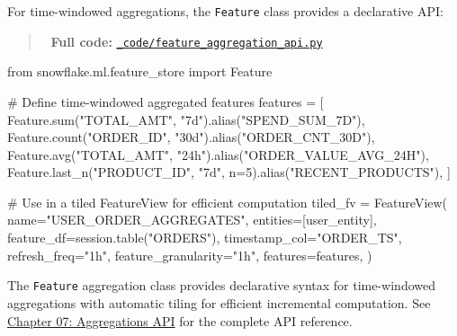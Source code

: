 \documentclass[
  letterpaper,
  DIV=11,
  numbers=noendperiod]{scrreprt}
\newenvironment{Shaded}{\begin{snugshade}}{\end{snugshade}}
\newcommand{\BuiltInTok}[1]{\textcolor[rgb]{0.00,0.23,0.31}{#1}}
\newcommand{\CommentTok}[1]{\textcolor[rgb]{0.37,0.37,0.37}{#1}}
\newcommand{\DecValTok}[1]{\textcolor[rgb]{0.68,0.00,0.00}{#1}}
\newcommand{\ImportTok}[1]{\textcolor[rgb]{0.00,0.46,0.62}{#1}}
\newcommand{\NormalTok}[1]{\textcolor[rgb]{0.00,0.23,0.31}{#1}}
\newcommand{\OperatorTok}[1]{\textcolor[rgb]{0.37,0.37,0.37}{#1}}
\newcommand{\StringTok}[1]{\textcolor[rgb]{0.13,0.47,0.30}{#1}}
\begin{document}
For time-windowed aggregations, the \texttt{Feature} class provides a
declarative API:

\begin{quote}
📁 \textbf{Full code:}
\href{_code/feature_aggregation_api.py}{\texttt{\_code/feature\_aggregation\_api.py}}
\end{quote}

\begin{Shaded}
\begin{Highlighting}[]
\ImportTok{from}\NormalTok{ snowflake.ml.feature\_store }\ImportTok{import}\NormalTok{ Feature}

\CommentTok{\# Define time{-}windowed aggregated features}
\NormalTok{features }\OperatorTok{=}\NormalTok{ [}
\NormalTok{    Feature.}\BuiltInTok{sum}\NormalTok{(}\StringTok{"TOTAL\_AMT"}\NormalTok{, }\StringTok{"7d"}\NormalTok{).alias(}\StringTok{"SPEND\_SUM\_7D"}\NormalTok{),}
\NormalTok{    Feature.count(}\StringTok{"ORDER\_ID"}\NormalTok{, }\StringTok{"30d"}\NormalTok{).alias(}\StringTok{"ORDER\_CNT\_30D"}\NormalTok{),}
\NormalTok{    Feature.avg(}\StringTok{"TOTAL\_AMT"}\NormalTok{, }\StringTok{"24h"}\NormalTok{).alias(}\StringTok{"ORDER\_VALUE\_AVG\_24H"}\NormalTok{),}
\NormalTok{    Feature.last\_n(}\StringTok{"PRODUCT\_ID"}\NormalTok{, }\StringTok{"7d"}\NormalTok{, n}\OperatorTok{=}\DecValTok{5}\NormalTok{).alias(}\StringTok{"RECENT\_PRODUCTS"}\NormalTok{),}
\NormalTok{]}

\CommentTok{\# Use in a tiled FeatureView for efficient computation}
\NormalTok{tiled\_fv }\OperatorTok{=}\NormalTok{ FeatureView(}
\NormalTok{    name}\OperatorTok{=}\StringTok{"USER\_ORDER\_AGGREGATES"}\NormalTok{,}
\NormalTok{    entities}\OperatorTok{=}\NormalTok{[user\_entity],}
\NormalTok{    feature\_df}\OperatorTok{=}\NormalTok{session.table(}\StringTok{"ORDERS"}\NormalTok{),}
\NormalTok{    timestamp\_col}\OperatorTok{=}\StringTok{"ORDER\_TS"}\NormalTok{,}
\NormalTok{    refresh\_freq}\OperatorTok{=}\StringTok{"1h"}\NormalTok{,}
\NormalTok{    feature\_granularity}\OperatorTok{=}\StringTok{"1h"}\NormalTok{,}
\NormalTok{    features}\OperatorTok{=}\NormalTok{features,}
\NormalTok{)}
\end{Highlighting}
\end{Shaded}

\begin{tcolorbox}[enhanced jigsaw, title=\textcolor{quarto-callout-note-color}{\faInfo}\hspace{0.5em}{🆕 New in snowflake-ml 1.21+}, colbacktitle=quarto-callout-note-color!10!white, rightrule=.15mm, arc=.35mm, colframe=quarto-callout-note-color-frame, left=2mm, bottomtitle=1mm, toptitle=1mm, breakable, bottomrule=.15mm, opacityback=0, titlerule=0mm, toprule=.15mm, opacitybacktitle=0.6, colback=white, coltitle=black, leftrule=.75mm]

The \texttt{Feature} aggregation class provides declarative syntax for
time-windowed aggregations with automatic tiling for efficient
incremental computation. See
\protect\hyperlink{aggregations-api}{Chapter 07: Aggregations API} for
the complete API reference.

\end{tcolorbox}
\end{document}
